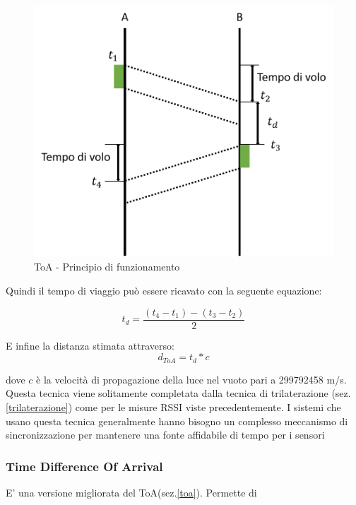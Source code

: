 \begin{figure}[H]  
	\centering 
	\includegraphics[scale=0.4]{ContestoApplicativo/toa.png}
	\caption{ToA - Principio di funzionamento}
	\label{fig:toa}
\end{figure}

Quindi il tempo di viaggio può essere ricavato con la seguente equazione:

\begin{equation}
t_d = \dfrac{(t_4 - t_1) - (t_3 - t_2)}{2}
\label{td}
\end{equation}

E infine la distanza stimata attraverso:
\begin{equation}
d_{ToA} = t_d * c
\label{eq:toa}
\end{equation}

dove $c$ è la velocità di propagazione della luce nel vuoto pari a 299792458 m/s. Questa tecnica viene solitamente completata dalla tecnica di trilaterazione (sez. \ref{trilaterazione}) come per le misure RSSI viste precedentemente. I sistemi che usano questa tecnica generalmente hanno bisogno un complesso meccanismo di sincronizzazione per mantenere una fonte affidabile di tempo per i sensori\cite{toaProblem}

\subsubsection{Time Difference Of Arrival}
\label{tdoa}
E' una versione migliorata del ToA(sez.\ref{toa}). Permette di 



